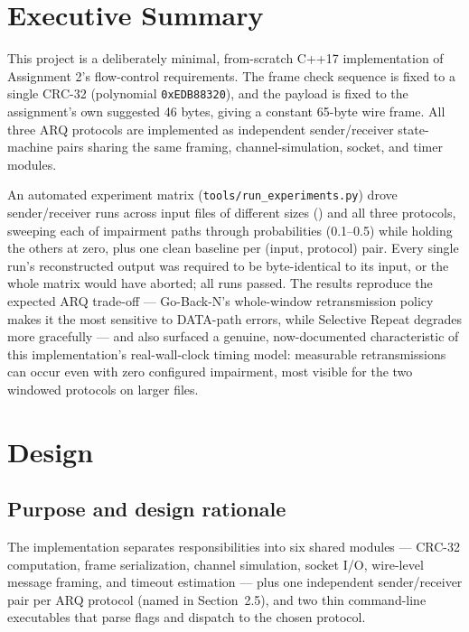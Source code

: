 \documentclass[11pt]{article}
\begin{document}
\section*{Executive Summary}
This project is a deliberately minimal, from-scratch C++17 implementation of Assignment 2's
flow-control requirements. The frame check sequence is fixed to a single CRC-32 (polynomial
\texttt{0xEDB88320}), and the payload is fixed to the assignment's own suggested 46 bytes, giving a
constant 65-byte wire frame. All three ARQ protocols are implemented as independent
sender/receiver state-machine pairs sharing the same framing, channel-simulation, socket, and
timer modules.

An automated experiment matrix (\texttt{tools/run\_experiments.py}) drove \NumRuns{} sender/receiver
runs across \NumInputs{} input files of different sizes (\InputSizeList{}) and all three protocols,
sweeping each of \NumPaths{} impairment paths through \NumProbabilities{} probabilities
(0.1--0.5) while holding the others at zero, plus one clean baseline per (input, protocol) pair. Every
single run's reconstructed output was required to be byte-identical to its input, or the whole matrix
would have aborted; all \NumRuns{} runs passed. The results reproduce the expected ARQ
trade-off --- Go-Back-N's whole-window retransmission policy makes it the most sensitive to
DATA-path errors, while Selective Repeat degrades more gracefully --- and also surfaced a genuine,
now-documented characteristic of this implementation's real-wall-clock timing model: measurable
retransmissions can occur even with zero configured impairment, most visible for the two
windowed protocols on larger files.

\section{Design}

\subsection{Purpose and design rationale}
The implementation separates responsibilities into six shared modules --- CRC-32 computation,
frame serialization, channel simulation, socket I/O, wire-level message framing, and timeout
estimation --- plus one independent sender/receiver pair per ARQ protocol (named in Section~2.5),
and two thin command-line executables that parse flags and dispatch to the chosen protocol.
\end{document}
